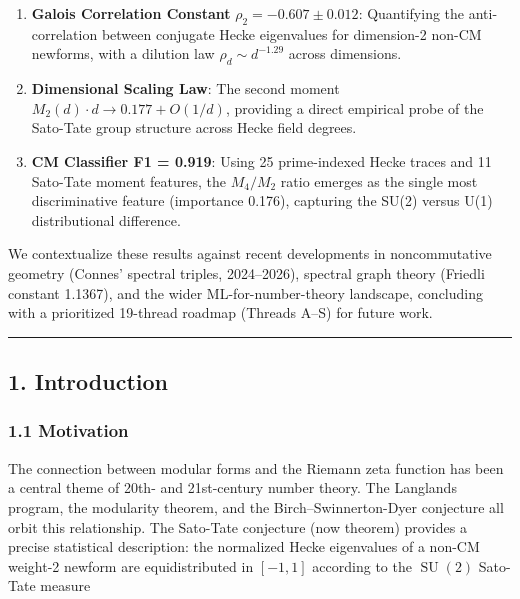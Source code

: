 \documentclass[
]{article}
\begin{document}
\begin{enumerate}
\def\labelenumi{\arabic{enumi}.}
\item
  \textbf{Galois Correlation Constant} \(\rho_2 = -0.607 \pm 0.012\):
  Quantifying the anti-correlation between conjugate Hecke eigenvalues
  for dimension-2 non-CM newforms, with a dilution law
  \(\rho_d \sim d^{-1.29}\) across dimensions.
\item
  \textbf{Dimensional Scaling Law}: The second moment
  \(M_2(d) \cdot d \to 0.177 + O(1/d)\), providing a direct empirical
  probe of the Sato-Tate group structure across Hecke field degrees.
\item
  \textbf{CM Classifier F1 = 0.919}: Using 25 prime-indexed Hecke traces
  and 11 Sato-Tate moment features, the \(M_4/M_2\) ratio emerges as the
  single most discriminative feature (importance 0.176), capturing the
  SU(2) versus U(1) distributional difference.
\end{enumerate}

We contextualize these results against recent developments in
noncommutative geometry (Connes' spectral triples, 2024--2026), spectral
graph theory (Friedli constant 1.1367), and the wider
ML-for-number-theory landscape, concluding with a prioritized 19-thread
roadmap (Threads A--S) for future work.

\begin{center}\rule{0.5\linewidth}{0.5pt}\end{center}

\hypertarget{introduction}{%
\subsection{1. Introduction}\label{introduction}}

\hypertarget{motivation}{%
\subsubsection{1.1 Motivation}\label{motivation}}

The connection between modular forms and the Riemann zeta function has
been a central theme of 20th- and 21st-century number theory. The
Langlands program, the modularity theorem, and the
Birch--Swinnerton-Dyer conjecture all orbit this relationship. The
Sato-Tate conjecture (now theorem) provides a precise statistical
description: the normalized Hecke eigenvalues of a non-CM weight-2
newform are equidistributed in \([-1,1]\) according to the
\(\operatorname{SU}(2)\) Sato-Tate measure
\end{document}

